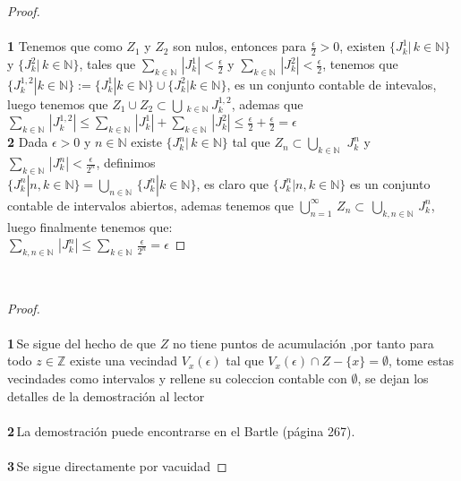 \documentclass[11pt,letterpaper]{article}
\newcommand{\R}{\mathbb{R}}
\newcommand{\N}{\mathbb{N}}
\newcommand{\Z}{\mathbb{Z}}
\newcommand{\Q}{\mathbb{Q}}
\begin{document}
\begin{proof}\,\\
    \,\\
    \textbf{1}\,\,Tenemos que como $Z_1$ y $Z_2$ son nulos, entonces para $\frac{\epsilon}{2}>0$, existen $\{J^{1}_{k}|\,k\in \N\}$ y $\{J^{2}_{k}|\,k\in \N\}$, tales que
    $\sum_{k\in \N}\,|J^1_{k}|<\frac{\epsilon}{2}$ y $\sum_{k\in \N}\,|J^2_{k}|<\frac{\epsilon}{2}$, tenemos que $\{J^{1,2}_{k}|k\in \N\}:=\{J^1_{k}|k\in \N\}\cup\{J^2_{k}|k\in \N\}$, es un conjunto contable
    de intevalos, luego tenemos que $Z_1\cup Z_2\subset \bigcup\,_{k\in \N}\,J^{1,2}_{k}$, ademas que \\$\sum_{k\in \N}\,|J_k^{1,2}|\leq\sum_{k\in \N}\,|J^1_{k}|+\sum_{k\in \N}\,|J^2_{k}|
    \leq \frac{\epsilon}{2}+\frac{\epsilon}{2}=\epsilon$
    \newpage
    \,\\
    \textbf{2}\,\,Dada $\epsilon>0$ y $n\in \N$ existe $\{J^n_{k}|\,k\in \N\}$ tal que $Z_n\subset\bigcup_{k\in \N}\,\,J^{n}_{k}$ y $\sum_{k\in \N}\,|J^n_{k}|<\frac{\epsilon}{2^n}$, definimos\\
    $\{J^{n}_{k}|n,k\in \N\}=\bigcup_{n\in \N}\,\{J^n_{k}|k\in \N\}$, es claro que $\{J^{n}_{k}|n,k\in \N\}$ es un conjunto contable de intervalos abiertos, ademas tenemos que
    $\bigcup_{n=1}^{\infty}\,Z_n\subset\,\bigcup_{k,n\in \N}\,J^{n}_{k}$, luego finalmente tenemos que:\,\\
    $\sum_{k,n\in \N}\,|J^n_{k}|\leq \sum_{k\in \N}\,\frac{\epsilon}{2^n}=\epsilon$
\end{proof}\,\\
\begin{proof}\,\\
    \,\\
    \textbf{1}\,Se sigue del hecho de que $Z$ no tiene puntos de acumulaci\'on ,por tanto para todo $z\in \Z$ existe una vecindad $V_{x}(\epsilon)$ tal que $V_{x}(\epsilon)\cap Z-\{x\}=\emptyset$, tome estas vecindades como intervalos y rellene su coleccion contable con $\emptyset$, se dejan los detalles
    de la demostraci\'on al lector\,\\
    \,\\
    \textbf{2}\,La demostraci\'on puede encontrarse en el Bartle (p\'agina 267).\,\\
    \,\\
    \textbf{3}\,Se sigue directamente por vacuidad
\end{proof}
\end{document}
